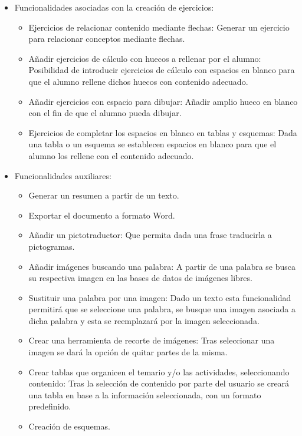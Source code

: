 \begin{itemize}
  \item Funcionalidades asociadas con la creación de ejercicios:
        \begin{itemize}
          \item Ejercicios de relacionar contenido mediante flechas: Generar un ejercicio para relacionar conceptos mediante flechas.
          \item Añadir ejercicios de cálculo con huecos a rellenar por el alumno: Posibilidad de introducir ejercicios de cálculo con espacios en blanco para que el alumno rellene dichos huecos con contenido adecuado.
          \item Añadir ejercicios con espacio para dibujar: Añadir amplio hueco en blanco con el fin de que el alumno pueda dibujar.
          \item Ejercicios de completar los espacios en blanco en tablas y esquemas: Dada una tabla o un esquema se establecen espacios en blanco para que el alumno los rellene con el contenido adecuado.
        \end{itemize}

  \item Funcionalidades auxiliares:
        \begin{itemize}
          \item Generar un resumen a partir de un texto.
          \item Exportar el documento a formato Word.
          \item Añadir un pictotraductor: Que permita dada una frase traducirla a pictogramas.
          \item Añadir imágenes buscando una palabra: A partir de una palabra se busca su respectiva imagen en las bases de datos de imágenes libres.
          \item Sustituir una palabra por una imagen: Dado un texto esta funcionalidad permitirá que se seleccione una palabra, se busque una imagen asociada a dicha palabra y esta se reemplazará por la imagen seleccionada.
          \item Crear una herramienta de recorte de imágenes: Tras seleccionar una imagen se dará la opción de quitar partes de la misma.
          \item Crear tablas que organicen el temario y/o las actividades, seleccionando contenido: Tras la selección de contenido por parte del usuario se creará una tabla en base a la información seleccionada, con un formato predefinido.
          \item Creación de esquemas.
        \end{itemize}

\end{itemize}

